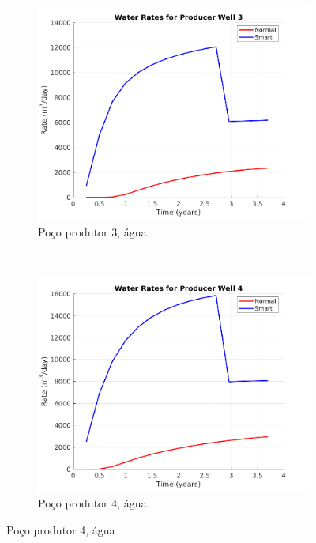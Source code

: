 \begin{figure}[!ht]
	\begin{subfigure}[b]{.45\textwidth}
		\includegraphics[width=\textwidth]{figs/resultadosSSAIGUP/SSAIGUP_WaterWell3_Zoom}
		\caption{Po\c{c}o produtor 3, \'{a}gua}
		\label{SSAIGUP_WaterWell3}
	\end{subfigure}
	~
	\begin{subfigure}[b]{.45\textwidth}
		\includegraphics[width=\textwidth]{figs/resultadosSSAIGUP/SSAIGUP_WaterWell4_Zoom}
		\caption{Po\c{c}o produtor 4, \'{a}gua}
		\label{SSAIGUP_WaterWell4}
	\end{subfigure}
	

\end{figure}
